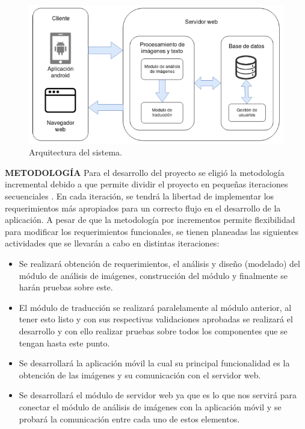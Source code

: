 \begin{figure}[h]
\centering
\includegraphics[width=1.0\textwidth]{capitulo1/images/arquitectura.png}
\caption{Arquitectura del sistema.}
\label{fig:arquitectura}
\end{figure}
\newpage

\textbf{METODOLOGÍA} Para el desarrollo del proyecto se eligió la metodología incremental debido a que permite dividir el proyecto en pequeñas iteraciones secuenciales \cite{iterativeDevelopment}. En cada iteración, se tendrá la libertad de implementar los requerimientos más apropiados para un correcto flujo en el desarrollo de la aplicación. A pesar de que la metodología por incrementos permite flexibilidad para modificar los requerimientos funcionales, se tienen planeadas las siguientes actividades que se llevarán a cabo en distintas iteraciones:
\bigskip
\begin{itemize}
    \item Se realizará obtención de requerimientos, el análisis y diseño (modelado) del módulo de análisis de imágenes, construcción del módulo y finalmente se harán pruebas sobre este.
    \item El módulo de traducción se realizará paralelamente al módulo anterior, al tener esto listo y con sus respectivas validaciones aprobadas se realizará el desarrollo y con ello realizar pruebas sobre todos los componentes que se tengan hasta este punto.
    \item Se desarrollará la aplicación móvil la cual su principal funcionalidad es la obtención de las imágenes y su comunicación con el servidor web.
    \item Se desarrollará el módulo de servidor web ya que es lo que nos servirá para conectar el módulo de análisis de imágenes con la aplicación móvil y se probará la comunicación entre cada uno de estos elementos.
\end{itemize}




